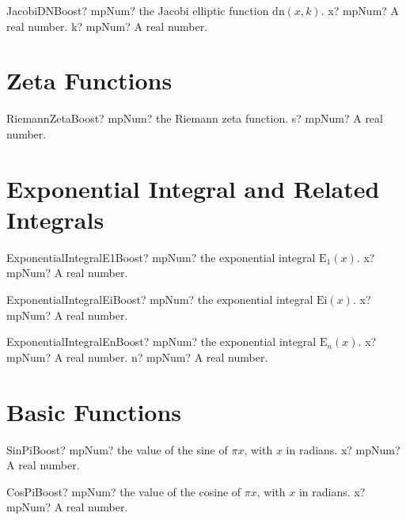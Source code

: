 \documentclass[12pt,a4paper,openany]{book}
\begin{document}
\begin{mpFunctionsExtract}
\mpFunctionTwo
{JacobiDNBoost? mpNum? the Jacobi elliptic function $\text{dn}(x, k)$.}
{x? mpNum? A real number.}
{k? mpNum? A real number.}
\end{mpFunctionsExtract}

\section{Zeta Functions}

\begin{mpFunctionsExtract}
\mpFunctionOne
{RiemannZetaBoost? mpNum? the Riemann zeta function.}
{s? mpNum? A real number.}
\end{mpFunctionsExtract}

\section{Exponential Integral and Related Integrals}

\begin{mpFunctionsExtract}
\mpFunctionOne
{ExponentialIntegralE1Boost? mpNum? the exponential integral $\text{E}_1(x)$.}
{x? mpNum? A real number.}
\end{mpFunctionsExtract}

\begin{mpFunctionsExtract}
\mpFunctionOne
{ExponentialIntegralEiBoost? mpNum? the exponential integral $\text{Ei}(x)$.}
{x? mpNum? A real number.}
\end{mpFunctionsExtract}

\begin{mpFunctionsExtract}
\mpFunctionTwo
{ExponentialIntegralEnBoost? mpNum? the exponential integral  $\text{E}_n(x)$.}
{x? mpNum? A real number.}
{n? mpNum? A real number.}
\end{mpFunctionsExtract}

\section{Basic Functions}

\begin{mpFunctionsExtract}
\mpFunctionOne
{SinPiBoost? mpNum? the value of the sine of $\pi x$, with $x$ in radians.}
{x? mpNum? A real number.}
\end{mpFunctionsExtract}

\begin{mpFunctionsExtract}
\mpFunctionOne
{CosPiBoost? mpNum? the value of the cosine of $\pi x$, with $x$ in radians.}
{x? mpNum? A real number.}
\end{mpFunctionsExtract}
\end{document}
